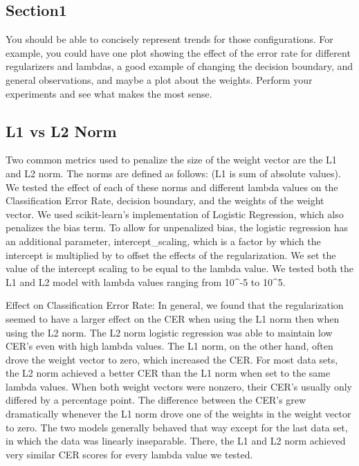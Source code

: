 \documentclass[a4paper,twoside]{article}
\begin{document}
\subsection{Section1}


You should be able to concisely represent trends for those configurations. For example, you could have one plot showing the effect of the error rate for different regularizers and lambdas, a good example of changing the decision boundary, and general observations, and maybe a plot about the weights. Perform your experiments and see what makes the most sense.

\subsection{L1 vs L2 Norm}

Two common metrics used to penalize the size of the weight vector are the L1 and L2 norm. The norms are defined as follows: (L1 is sum of absolute values). We tested the effect of each of these norms and different lambda values on the Classification Error Rate, decision boundary, and the weights of the weight vector. We used scikit-learn's implementation of Logistic Regression, which also penalizes the bias term. To allow for unpenalized bias, the logistic regression has an additional parameter, intercept_scaling, which is a factor by which the intercept is multiplied by to offset the effects of the regularization. We set the value of the intercept scaling to be equal to the lambda value. We tested both the L1 and L2 model with lambda values ranging from 10^-5 to 10^5. 

Effect on Classification Error Rate:
In general, we found that the regularization seemed to have a larger effect on the CER when using the L1 norm then when using the L2 norm. The L2 norm logistic regression was able to maintain low CER's even with high lambda values. The L1 norm, on the other hand, often drove the weight vector to zero, which increased the CER. For most data sets, the L2 norm achieved a better CER than the L1 norm when set to the same lambda values. When both weight vectors were nonzero, their CER's usually only differed by a percentage point. The difference between the CER's grew dramatically whenever the L1 norm drove one of the weights in the weight vector to zero. The two models generally behaved that way except for the last data set, in which the data was linearly inseparable. There, the L1 and L2 norm achieved very similar CER scores for every lambda value we tested. 
\end{document}
